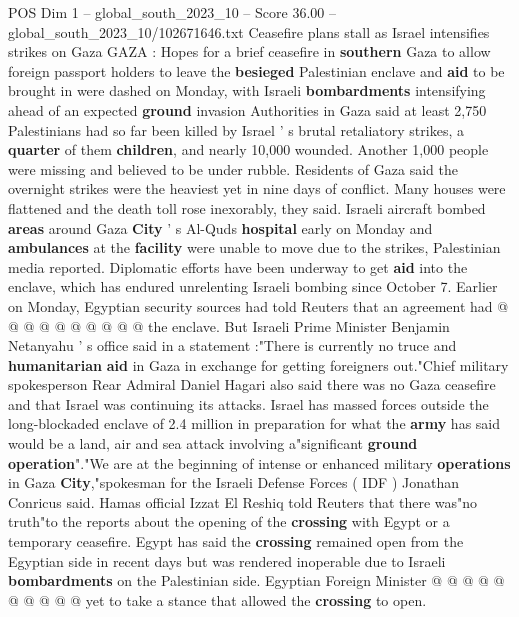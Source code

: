 \begin{textsample}{POS Dim 1 – global\_south\_2023\_10 – Score 36.00 – global\_south\_2023\_10/102671646.txt}  \label{ex:f1_pos_185}
Ceasefire plans stall as Israel intensifies strikes on Gaza GAZA : Hopes for a brief ceasefire in \textbf{southern} Gaza to allow foreign passport holders to leave the \textbf{besieged} Palestinian enclave and \textbf{aid} to be brought in were dashed on Monday, with Israeli \textbf{bombardments} intensifying ahead of an expected \textbf{ground} invasion Authorities in Gaza said at least 2,750 Palestinians had so far been killed by Israel ' s brutal retaliatory strikes, a \textbf{quarter} of them \textbf{children}, and nearly 10,000 wounded.
Another 1,000 people were missing and believed to be under rubble.
Residents of Gaza said the overnight strikes were the heaviest yet in nine days of conflict.
Many houses were flattened and the death toll rose inexorably, they said.
Israeli aircraft bombed \textbf{areas} around Gaza \textbf{City} ' s Al-Quds \textbf{hospital} early on Monday and \textbf{ambulances} at the \textbf{facility} were unable to move due to the strikes, Palestinian media reported.
Diplomatic efforts have been underway to get \textbf{aid} into the enclave, which has endured unrelenting Israeli bombing since October 7.
Earlier on Monday, Egyptian security sources had told Reuters that an agreement had @ @ @ @ @ @ @ @ @ @ the enclave.
But Israeli Prime Minister Benjamin Netanyahu ' s office said in a statement :"There is currently no truce and \textbf{humanitarian} \textbf{aid} in Gaza in exchange for getting foreigners out."Chief military spokesperson Rear Admiral Daniel Hagari also said there was no Gaza ceasefire and that Israel was continuing its attacks.
Israel has massed forces outside the long-blockaded enclave of 2.4 million in preparation for what the \textbf{army} has said would be a land, air and sea attack involving a"significant \textbf{ground} \textbf{operation}"."We are at the beginning of intense or enhanced military \textbf{operations} in Gaza \textbf{City},"spokesman for the Israeli Defense Forces ( IDF ) Jonathan Conricus said.
Hamas official Izzat El Reshiq told Reuters that there was"no truth"to the reports about the opening of the \textbf{crossing} with Egypt or a temporary ceasefire.
Egypt has said the \textbf{crossing} remained open from the Egyptian side in recent days but was rendered inoperable due to Israeli \textbf{bombardments} on the Palestinian side.
Egyptian Foreign Minister @ @ @ @ @ @ @ @ @ @ yet to take a stance that allowed the \textbf{crossing} to open.

\end{textsample}
